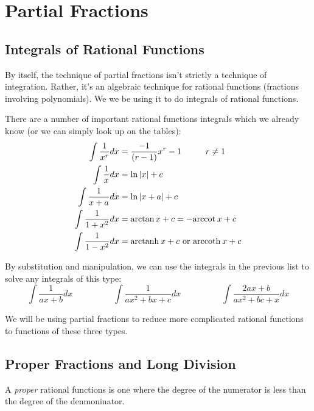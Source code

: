 \documentclass[fleqn]{report}
\begin{document}
\section{Partial Fractions}
\label{partial-fractions}

\subsection{Integrals of Rational Functions}
\label{rational-functions}

By itself, the technique of partial fractions isn't strictly a
technique of integration. Rather, it's an algebraic technique
for rational functions (fractions involving polynomials). We
we be using it to do integrals of rational functions.

There are a number of important rational functions integrals
which we already know (or we can simply look up on the
tables):
\begin{align*}
\int \frac{1}{x^r} dx & = \frac{-1}{(r-1)}{x^r-1} \hspace{1cm} r
\neq 1 \\
\int \frac{1}{x} dx & = \ln |x| + c \\
\int \frac{1}{x+a} dx & = \ln |x+a| + c \\
\int \frac{1}{1+x^2} dx & = \arctan x + c = -\mathrm{arccot\hspace{0.07cm}} x + c \\
\int \frac{1}{1-x^2} dx & = \mathrm{arctanh\hspace{0.07cm}} x + c \text{ or } \mathrm{arccoth\hspace{0.07cm}} x
+ c
\end{align*}

By substitution and manipulation, we can use the integrals in
the previous list to solve any integrals of this type:
\begin{equation*}
\int \frac{1}{ax+b} dx \hspace{2cm} 
\int \frac{1}{ax^2 + bx + c} dx \hspace{2cm} 
\int \frac{2ax+ b}{ax^2+bc+x} dx 
\end{equation*}

We will be using partial fractions to reduce more complicated
rational functions to functions of these three types.

\subsection{Proper Fractions and Long Division}
\label{long-division}

\begin{defn}
A \emph{proper} rational functions is one where the degree of
the numerator is less than the degree of the denmoninator.
\end{defn}
\end{document}
